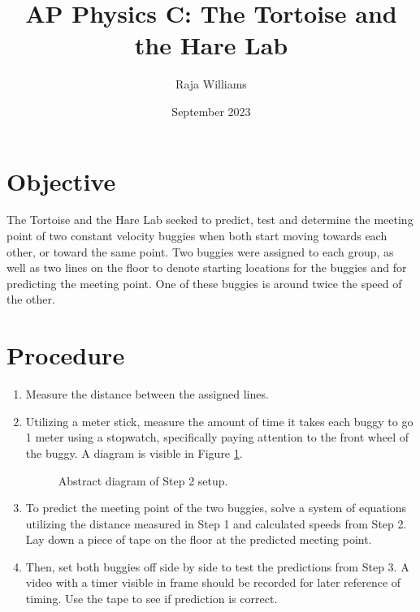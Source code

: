 \documentclass[12pt,twoside]{article}
\begin{document}
\title{AP Physics C: The Tortoise and the Hare Lab}
\author{Raja Williams}
\date{September 2023}
\maketitle

\section{Objective}
The Tortoise and the Hare Lab seeked to predict, test and determine the meeting
point of two constant velocity buggies when both start moving towards each
other, or toward the same point. Two buggies were assigned to each group, as
well as two lines on the floor to denote starting locations for the buggies and
for predicting the meeting point. One of these buggies is around twice the speed
of the other.

\section{Procedure}

\begin{enumerate}
\item Measure the distance between the assigned lines.
\item Utilizing a meter stick, measure the amount of time it takes each buggy to
    go 1 meter using a stopwatch, specifically paying attention to the front
    wheel of the buggy. A diagram is visible in Figure \ref{fig:step2}.
\begin{figure}[h]
    \centering
    \caption{Abstract diagram of Step 2 setup.}
    \label{fig:step2}
\end{figure}
\item To predict the meeting point of the two buggies, solve a system of
    equations utilizing the distance measured in Step 1 and calculated speeds
    from Step 2. Lay down a piece of tape on the floor at the predicted meeting
    point.
\item Then, set both buggies off side by side to test the predictions from Step
    3. A video with a timer visible in frame should be recorded for later
    reference of timing. Use the tape to see if prediction is correct.

\end{enumerate}
\end{document}
